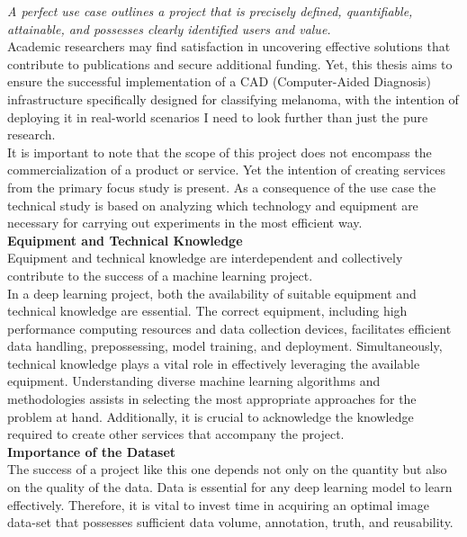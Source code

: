 \textit{A perfect use case outlines a project that is precisely defined, quantifiable, attainable, and possesses clearly identified users and value.} \\

Academic researchers may find satisfaction in uncovering effective solutions that contribute to publications and secure additional funding. Yet, this thesis aims to ensure the successful implementation of a CAD (Computer-Aided Diagnosis) infrastructure specifically designed for classifying melanoma, with the intention of deploying it in real-world scenarios I need to look further than just the pure research. \\

It is important to note that the scope of this project does not encompass the commercialization of a product or service. Yet the intention of creating services from the primary focus study is present. As a consequence of the use case the technical study is based on analyzing which
technology and equipment are necessary for carrying out experiments in
the most efficient way. \\

\vspace{0.5cm}
\textbf{Equipment and Technical Knowledge} \\

Equipment and technical knowledge are interdependent and collectively contribute to the success of a machine learning project. \\

In a deep learning project, both the availability of suitable equipment and technical knowledge are essential. The correct equipment, including high performance computing resources and data collection devices, facilitates efficient data handling, prepossessing, model training, and deployment. Simultaneously, technical knowledge plays a vital role in effectively leveraging the available equipment. Understanding diverse machine learning algorithms and methodologies assists in selecting the most appropriate approaches for the problem at hand. Additionally, it is crucial to acknowledge the knowledge required to create other services that accompany the project. \\

\vspace{0.5cm}
\textbf{Importance of the Dataset} \\

The success of a project like this one depends not only on the quantity but also on the quality of the data. Data is essential for any deep learning model to learn effectively. Therefore, it is vital to invest time in acquiring an optimal image data-set that possesses sufficient data volume, annotation, truth, and reusability. \\

